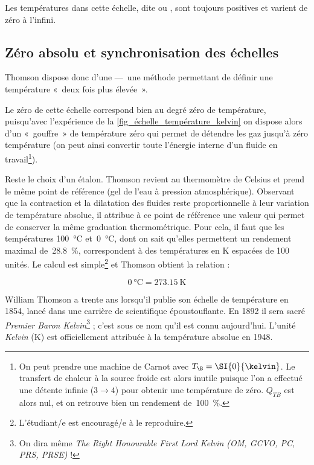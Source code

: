 		
		Les températures dans cette échelle, dite  ou , sont toujours positives et varient de zéro à l’infini. 
				
	\subsection{Zéro absolu et synchronisation des échelles}
	
		Thomson dispose donc d’une  —\ une méthode permettant de définir une température «~deux fois plus élevée~».
		
		Le zéro de cette échelle correspond bien au degré zéro de température, puisqu’avec l’expérience de la \cref{fig_échelle_température_kelvin} on dispose alors d’un «~gouffre~» de température zéro qui permet de détendre les gaz jusqu’à zéro température (on peut ainsi convertir toute l’énergie interne d’un fluide en travail\footnote{On peut prendre une machine de Carnot avec $T_\B = \SI{0}{\kelvin}$. Le transfert de chaleur à la source froide est alors inutile puisque l’on a effectué une détente infinie ($3 \to 4$) pour obtenir une température de zéro. $Q_{TB}$ est alors nul, et on retrouve bien un rendement de~\SI{100}{\percent}.}).
		
		Reste le choix d’un étalon. Thomson revient au thermomètre de Celsius et prend le même point de référence (gel de l’eau à pression atmosphérique). Observant que la contraction et la dilatation des fluides reste proportionnelle à leur variation de température absolue, il attribue à ce point de référence une valeur qui permet de conserver la même graduation thermométrique. Pour cela, il faut que les températures \SI{100}{\celsius} et~\SI{0}{\celsius}, dont on sait qu’elles permettent un rendement maximal de~\SI{28,8}{\percent}, correspondent à des températures en \si{\kelvin} espacées de 100 unités. Le calcul est simple\footnote{L’étudiant/e est encouragé/e à le reproduire.} et Thomson obtient la relation :
			
			\begin{equation}
			\SI{0}{\degreeCelsius} = \SI{273,15}{\kelvin}
			\label{eq_synchro_température}
			\end{equation}
		
		William Thomson a trente ans lorsqu’il publie son échelle de température en 1854, lancé dans une carrière de scientifique époustouflante. En 1892 il sera sacré \textit{Premier Baron Kelvin}\footnote{On dira même \textit{The Right Honourable First Lord Kelvin (OM, GCVO, PC, PRS, PRSE)} !} ; c’est sous ce nom qu’il est connu aujourd’hui. L’unité \textit{Kelvin} (\si{\kelvin}) est officiellement attribuée à la température absolue en 1948. 
		
